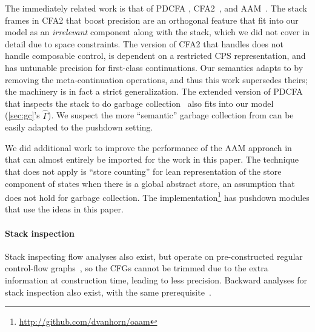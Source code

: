 The immediately related work is that of PDCFA \citep{dvanhorn:Earl2010Pushdown, dvanhorn:Earl2012Introspective}, CFA2~\citep{dvanhorn:Vardoulakis2011CFA2, dvanhorn:Vardoulakis2011Pushdown}, and AAM~\citep{dvanhorn:VanHorn2010Abstracting}.
%
The stack frames in CFA2 that boost precision are an orthogonal feature that fit into our model as an \emph{irrelevant} component along with the stack, which we did not cover in detail due to space constraints.
%
The version of CFA2 that handles  does not handle composable control, is dependent on a restricted CPS representation, and has untunable precision for first-class continuations.
%
Our semantics adapts to  by removing the meta-continuation operations, and thus this work supersedes theirs; the machinery is in fact a strict generalization.
%
The extended version of PDCFA that inspects the stack to do garbage collection~\citep{dvanhorn:Earl2012Introspective} also fits into our model (\autoref{sec:gc}'s $\hat\Gamma$).
%
We suspect the more ``semantic'' garbage collection from \citet{mc-via-gamma} can be easily adapted to the pushdown setting.

We did additional work to improve the performance of the AAM approach in \citet{dvanhorn:Johnson2013Optimizing} that can almost entirely be imported for the work in this paper.
%
The technique that does not apply is ``store counting'' for lean representation of the store component of states when there is a global abstract store, an assumption that does not hold for garbage collection.
%
The implementation\footnote{\url{http://github.com/dvanhorn/oaam}} has pushdown modules that use the ideas in this paper.

\paragraph{Stack inspection}
Stack inspecting flow analyses also exist, but operate on pre-constructed regular control-flow graphs~\citep{ianjohnson:bartoletti2004stack}, so the CFGs cannot be trimmed due to the extra information at construction time, leading to less precision.
%
Backward analyses for stack inspection also exist, with the same prerequisite~\citep{ianjohnson:DBLP:journals/sigplan/Chang06}.

